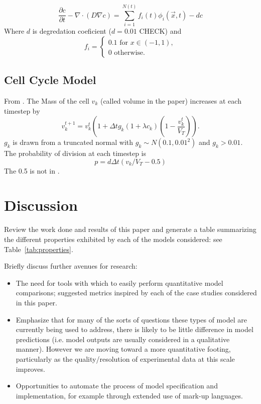\documentclass[12pt]{article}
\begin{document}
\begin{equation}
\frac{\partial c}{\partial t} - \nabla \cdot (D \nabla c) = \sum_{i=1}^{N(t)}f_{i}(t)\phi_i(\vec{x},t) - dc
\end{equation}
Where $d$ is degredation coeficient ($d=0.01$ CHECK) and 
\begin{equation}
f_i = \begin{cases}
        0.1 \text{ for } x \in (-1,1),
        \\
        0 \text{ otherwise.} 
        \end{cases}
\end{equation}
\subsection{Cell Cycle Model}
From \citet{Smith2011Incorporating}. The Mass of the cell $v_k$ (called volume in the paper) increases at each timestep by
\begin{equation}
v_{k}^{t+1} = v_{k}^{t} \left( 1+\Delta t g_k(1+\lambda c_{k})\left(1-\frac{v_{k}^{t}}{V_T}\right)\right).
\end{equation}
$g_k$ is drawn from a truncated normal with $g_{k} \sim N(0.1,0.01^{2})$ and $g_k>0.01$.
The probability of division at each timestep is 
\begin{equation}
p = d \Delta t (v_{k}/V_T - 0.5)
\end{equation}
The 0.5 is not in  \citet{Smith2011Incorporating}.




\section{Discussion} \label{sec:discussion}

Review the work done and results of this paper and generate a table summarizing the different properties exhibited by each of the models considered: see Table~\ref{tab:properties}.

\noindent Briefly discuss further avenues for research:
\begin{itemize}
\item The need for tools with which to easily perform quantitative model comparisons; suggested metrics inspired by each of the case studies considered in this paper.
\item Emphasize that for many of the sorts of questions these types of model are currently being used to address, there is likely to be little difference in model predictions (i.e. model outputs are usually considered in a qualitative manner). However we are moving toward a more quantitative footing, particularly as the quality/resolution of experimental data at this scale improves.
\item Opportunities to automate the process of model specification and implementation, for example through extended use of mark-up languages.
\end{itemize}
\end{document}
